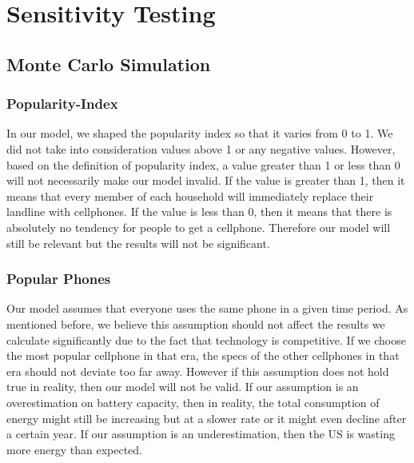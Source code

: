 \documentclass{article}
\begin{document}
\section{Sensitivity Testing}
\subsection{Monte Carlo Simulation}
\subsubsection{Popularity-Index}
In our model, we shaped the popularity index so that it varies from 0 to 1. We did not take into consideration values above 1 or any negative values. However, based on the definition of popularity index, a value greater than 1 or less than 0 will not necessarily make our model invalid. If the value is greater than 1, then it means that every member of each household will immediately replace their landline with cellphones. If the value is less than 0, then it means that there is absolutely no tendency for people to get a cellphone. Therefore our model will still be relevant but the results will not be significant.\par
\subsubsection{Popular Phones}
Our model assumes that everyone uses the same phone in a given time period. As mentioned before, we believe this assumption should not affect the results we calculate significantly due to the fact that technology is competitive. If we choose the most popular cellphone in that era, the specs of the other cellphones in that era should not deviate too far away. However if this assumption does not hold true in reality, then our model will not be valid. If our assumption is an overestimation on battery capacity, then in reality, the total consumption of energy might still be increasing but at a slower rate or it might even decline after a certain year. If our assumption is an underestimation, then the US is wasting more energy than expected.\par
\end{document}

